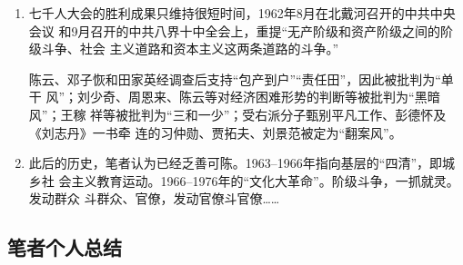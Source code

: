 \begin{enumerate}
\item 七千人大会的胜利成果只维持很短时间，1962年8月在北戴河召开的中共中央会议
  和9月召开的中共八界十中全会上，重提“无产阶级和资产阶级之间的阶级斗争、社会
  主义道路和资本主义这两条道路的斗争。”

  陈云、邓子恢和田家英经调查后支持“包产到户”“责任田”，因此被批判为“单干
  风”；刘少奇、周恩来、陈云等对经济困难形势的判断等被批判为“黑暗风”；王稼
  祥等被批判为“三和一少”；受右派分子甄别平凡工作、彭德怀及《刘志丹》一书牵
  连的习仲勋、贾拓夫、刘景范被定为“翻案风”。

\item 此后的历史，笔者认为已经乏善可陈。1963--1966年指向基层的“四清”，即城乡社
  会主义教育运动。1966--1976年的“文化大革命”。阶级斗争，一抓就灵。发动群众
  斗群众、官僚，发动官僚斗官僚……
\end{enumerate}

\subsection{笔者个人总结}

